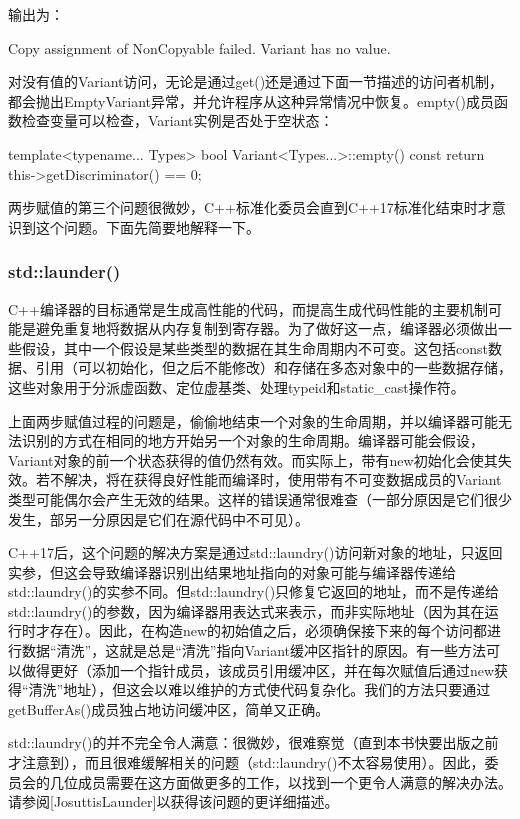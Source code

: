 输出为：

\begin{shell}
Copy assignment of NonCopyable failed.
Variant has no value.
\end{shell}

对没有值的Variant访问，无论是通过get()还是通过下面一节描述的访问者机制，都会抛出EmptyVariant异常，并允许程序从这种异常情况中恢复。empty()成员函数检查变量可以检查，Variant实例是否处于空状态：

\begin{cpp}
template<typename... Types>
bool Variant<Types...>::empty() const {
	return this->getDiscriminator() == 0;
}
\end{cpp}

两步赋值的第三个问题很微妙，C++标准化委员会直到C++17标准化结束时才意识到这个问题。下面先简要地解释一下。

\subsubsection{std::launder()}

C++编译器的目标通常是生成高性能的代码，而提高生成代码性能的主要机制可能是避免重复地将数据从内存复制到寄存器。为了做好这一点，编译器必须做出一些假设，其中一个假设是某些类型的数据在其生命周期内不可变。这包括const数据、引用（可以初始化，但之后不能修改）和存储在多态对象中的一些数据存储，这些对象用于分派虚函数、定位虚基类、处理typeid和static\_cast操作符。

上面两步赋值过程的问题是，偷偷地结束一个对象的生命周期，并以编译器可能无法识别的方式在相同的地方开始另一个对象的生命周期。编译器可能会假设，Variant对象的前一个状态获得的值仍然有效。而实际上，带有new初始化会使其失效。若不解决，将在获得良好性能而编译时，使用带有不可变数据成员的Variant类型可能偶尔会产生无效的结果。这样的错误通常很难查（一部分原因是它们很少发生，部另一分原因是它们在源代码中不可见）。

C++17后，这个问题的解决方案是通过std::laundry()访问新对象的地址，只返回实参，但这会导致编译器识别出结果地址指向的对象可能与编译器传递给std::laundry()的实参不同。但std::laundry()只修复它返回的地址，而不是传递给std::laundry()的参数，因为编译器用表达式来表示，而非实际地址（因为其在运行时才存在）。因此，在构造new的初始值之后，必须确保接下来的每个访问都进行数据“清洗”，这就是总是“清洗”指向Variant缓冲区指针的原因。有一些方法可以做得更好（添加一个指针成员，该成员引用缓冲区，并在每次赋值后通过new获得“清洗”地址），但这会以难以维护的方式使代码复杂化。我们的方法只要通过getBufferAs()成员独占地访问缓冲区，简单又正确。

std::laundry()的并不完全令人满意：很微妙，很难察觉（直到本书快要出版之前才注意到），而且很难缓解相关的问题（std::laundry()不太容易使用）。因此，委员会的几位成员需要在这方面做更多的工作，以找到一个更令人满意的解决办法。请参阅[JosuttisLaunder]以获得该问题的更详细描述。


